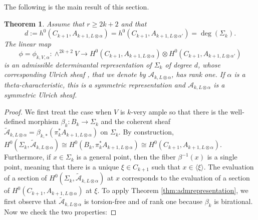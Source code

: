 \documentclass[12pt]{amsart}
\newcounter{thmcounter}
\numberwithin{equation}{section}
\numberwithin{thmcounter}{section}
\newtheorem{theorem}[thmcounter]{Theorem}
\theoremstyle{definition}
\theoremstyle{claim}
\newcommand{\sA}{\mathscr{A}}
\begin{document}
The following is the main result of this section.

\begin{theorem}\label{thm:detrep}
	Assume that $r\geq 2k+2$ and that \[d:=h^0(C_{k+1},A_{k+1,L\otimes \alpha}) = h^0(C_{k+1},A_{k+1,L\otimes \alpha'}) = \deg(\Sigma_k).\] The linear map
	\[  \phi = \phi_{k,V,\alpha} \colon \wedge^{2k+2} V \longrightarrow H^0(C_{k+1},A_{k+1,L\otimes \alpha}) \otimes H^0(C_{k+1},A_{k+1,L\otimes \alpha'}) \]
	is an admissible determinantal representation of $\Sigma_k$ of degree $d$, whose corresponding Ulrich sheaf , that we denote by $\sA_{k,L\otimes \alpha}$, has rank one. If $\alpha$ is a theta-characteristic, this is a symmetric representation and $\sA_{k,L\otimes \alpha}$ is a symmetric Ulrich sheaf.
\end{theorem}
\begin{proof}
	We first treat the case when $V$ is $k$-very ample so that there is  the well-defined morphism $\beta_k\colon B_k \longrightarrow \Sigma_k$ and the  coherent sheaf $\widetilde{\sA}_{k,L\otimes \alpha} = \beta_{k,*}(\pi_k^* A_{k+1,L\otimes \alpha})$ on $\Sigma_k$. By construction, $H^0(\Sigma_k,\widetilde{\sA}_{k,L\otimes \alpha}) \cong H^0(B_k,\pi_k^*A_{k+1,L\otimes \alpha}) \cong H^0(C_{k+1},A_{k+1,L\otimes \alpha})$. Furthermore, if $x \in \Sigma_k$ is a general point, then the fiber $\beta^{-1}(x)$ is a single point, meaning that there is a unique $\xi\in C_{k+1}$ such that $x\in \langle \xi \rangle$. The evaluation of a section of $H^0(\Sigma_k,\widetilde{\sA}_{k,L\otimes \alpha})$ at $x$ corresponds to the evaluation of a section of $H^0(C_{k+1},A_{k+1,L\otimes \alpha})$ at $\xi$. To apply Theorem \ref{thm:admrepresentation}, we first observe that $\widetilde{\sA}_{k,L\otimes \alpha}$ is torsion-free and of rank one because $\beta_k$ is birational.  Now we check the two properties:
	\medskip


\end{proof}
\end{document}
